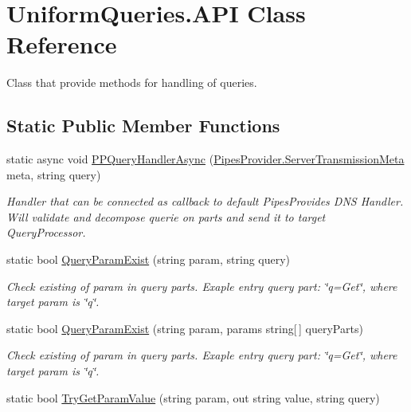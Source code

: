 \hypertarget{class_uniform_queries_1_1_a_p_i}{}\section{Uniform\+Queries.\+A\+PI Class Reference}
\label{class_uniform_queries_1_1_a_p_i}


Class that provide methods for handling of queries.  


\subsection*{Static Public Member Functions}
\begin{DoxyCompactItemize}
\item 
static async void \mbox{\hyperlink{class_uniform_queries_1_1_a_p_i_a2f6a1dee18c3b462a8a794d68e326dba}{P\+P\+Query\+Handler\+Async}} (\mbox{\hyperlink{class_pipes_provider_1_1_server_transmission_meta}{Pipes\+Provider.\+Server\+Transmission\+Meta}} meta, string query)
\begin{DoxyCompactList}\small\item\em Handler that can be connected as callback to default Pipes\+Provides D\+NS Handler. Will validate and decompose querie on parts and send it to target Query\+Processor. \end{DoxyCompactList}\item 
static bool \mbox{\hyperlink{class_uniform_queries_1_1_a_p_i_a1a0ad73e1dad7f7ec61398cb33ec18a4}{Query\+Param\+Exist}} (string param, string query)
\begin{DoxyCompactList}\small\item\em Check existing of param in query parts. Exaple entry query part\+: \char`\"{}q=\+Get\char`\"{}, where target param is \char`\"{}q\char`\"{}. \end{DoxyCompactList}\item 
static bool \mbox{\hyperlink{class_uniform_queries_1_1_a_p_i_a0f6c53ca64000015c8bf7bed30d9c57a}{Query\+Param\+Exist}} (string param, params string\mbox{[}$\,$\mbox{]} query\+Parts)
\begin{DoxyCompactList}\small\item\em Check existing of param in query parts. Exaple entry query part\+: \char`\"{}q=\+Get\char`\"{}, where target param is \char`\"{}q\char`\"{}. \end{DoxyCompactList}\item 
static bool \mbox{\hyperlink{class_uniform_queries_1_1_a_p_i_a987eb23a48b90e542001cc12fcbc1ddc}{Try\+Get\+Param\+Value}} (string param, out string value, string query)

\end{DoxyCompactItemize}

